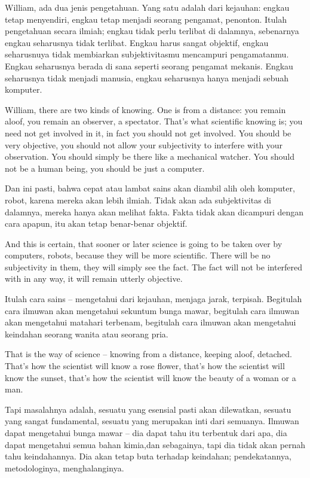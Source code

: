 \bahasa
William, ada dua jenis pengetahuan. Yang satu adalah dari kejauhan: engkau tetap menyendiri, engkau tetap menjadi seorang pengamat, penonton. Itulah pengetahuan secara ilmiah; engkau tidak perlu terlibat di dalamnya, sebenarnya engkau seharusnya tidak terlibat. Engkau harus sangat objektif, engkau seharusnuya tidak membiarkan subjektivitasmu mencampuri pengamatanmu. Engkau seharusnya berada di sana seperti seorang pengamat mekanis. Engkau seharusnya tidak menjadi manusia, engkau seharusnya hanya menjadi sebuah komputer.

\english
William, there are two kinds of knowing. One is from a distance: you remain aloof, you remain an observer, a spectator. That's what scientific knowing is; you need not get involved in it, in fact you should not get involved. You should be very objective, you should not allow your subjectivity to interfere with your observation. You should simply be there like a mechanical watcher. You should not be a human being, you should be just a computer.

\bahasa
Dan ini pasti, bahwa cepat atau lambat sains akan diambil alih oleh komputer, robot, karena mereka akan lebih ilmiah. Tidak akan ada subjektivitas di dalamnya, mereka hanya akan melihat fakta. Fakta tidak akan dicampuri dengan cara apapun, itu akan tetap benar-benar objektif.

\english
And this is certain, that sooner or later science is going to be taken over by computers, robots, because they will be more scientific. There will be no subjectivity in them, they will simply see the fact. The fact will not be interfered with in any way, it will remain utterly objective.

\bahasa
Itulah cara sains -- mengetahui dari kejauhan, menjaga jarak, terpisah. Begitulah cara ilmuwan akan mengetahui sekuntum bunga mawar, begitulah cara ilmuwan akan mengetahui matahari terbenam, begitulah cara ilmuwan akan mengetahui keindahan seorang wanita atau seorang pria.

\english
That is the way of science -- knowing from a distance, keeping aloof, detached. That's how the scientist will know a rose flower, that's how the scientist will know the sunset, that's how the scientist will know the beauty of a woman or a man.

\bahasa
Tapi masalahnya adalah, sesuatu yang esensial pasti akan dilewatkan, sesuatu yang sangat fundamental, sesuatu yang merupakan inti dari semuanya. Ilmuwan dapat mengetahui bunga mawar -- dia dapat tahu itu terbentuk dari apa, dia dapat mengetahui semua bahan kimia,dan sebagainya, tapi dia tidak akan pernah tahu keindahannya. Dia akan tetap buta terhadap keindahan; pendekatannya, metodologinya, menghalanginya.

